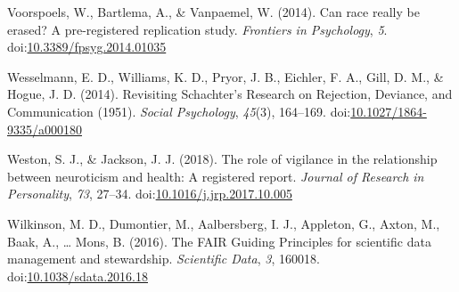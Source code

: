 \documentclass[
  ,jou, a4paper,floatsintext]{apa6}
\begin{document}
\leavevmode\hypertarget{ref-voorspoels_can_2014}{}%
Voorspoels, W., Bartlema, A., \& Vanpaemel, W. (2014). Can race really be erased? A pre-registered replication study. \emph{Frontiers in Psychology}, \emph{5}. doi:\href{https://doi.org/10.3389/fpsyg.2014.01035}{10.3389/fpsyg.2014.01035}

\leavevmode\hypertarget{ref-wesselmann_revisiting_2014}{}%
Wesselmann, E. D., Williams, K. D., Pryor, J. B., Eichler, F. A., Gill, D. M., \& Hogue, J. D. (2014). Revisiting Schachter's Research on Rejection, Deviance, and Communication (1951). \emph{Social Psychology}, \emph{45}(3), 164--169. doi:\href{https://doi.org/10.1027/1864-9335/a000180}{10.1027/1864-9335/a000180}

\leavevmode\hypertarget{ref-weston_role_2018}{}%
Weston, S. J., \& Jackson, J. J. (2018). The role of vigilance in the relationship between neuroticism and health: A registered report. \emph{Journal of Research in Personality}, \emph{73}, 27--34. doi:\href{https://doi.org/10.1016/j.jrp.2017.10.005}{10.1016/j.jrp.2017.10.005}

\leavevmode\hypertarget{ref-wilkinson_fair_2016}{}%
Wilkinson, M. D., Dumontier, M., Aalbersberg, I. J., Appleton, G., Axton, M., Baak, A., \ldots{} Mons, B. (2016). The FAIR Guiding Principles for scientific data management and stewardship. \emph{Scientific Data}, \emph{3}, 160018. doi:\href{https://doi.org/10.1038/sdata.2016.18}{10.1038/sdata.2016.18}
\end{document}
